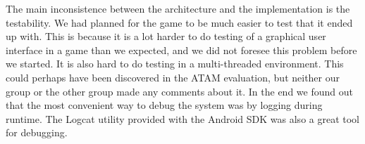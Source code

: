 The main inconsistence between the architecture and the implementation is the testability. We had planned for the game to be much easier to test that it ended up with. This is because it is a lot harder to do testing of a graphical user interface in a game than we expected, and we did not foresee this problem before we started. It is also hard to do testing in a multi-threaded environment. This could perhaps have been discovered in the ATAM evaluation, but neither our group or the other group made any comments about it. In the end we found out that the most convenient way to debug the system was by logging during runtime. The Logcat utility provided with the Android SDK was also a great tool for debugging.